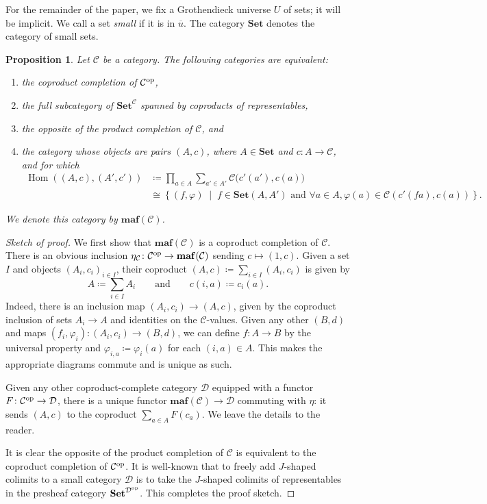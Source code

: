 \documentclass[11pt, one side, article]{memoir}
\theoremstyle{definition}
\theoremstyle{plain}
\newtheorem{proposition}[definitionx]{Proposition}
\DeclareMathOperator{\Hom}{Hom}
\newcommand{\cat}[1]{\mathcal{#1}}%
\newcommand{\Cat}[1]{\mathbf{#1}}%
\newcommand{\op}{^\tn{op}}
\newcommand{\tn}[1]{\textnormal{#1}}
\newcommand{\ol}[1]{\overline{#1}}
\newcommand{\smset}{\Cat{Set}}
\newcommand{\0}{\Cat{0}}
\newcommand{\1}{\Cat{1}}
\newcommand{\opfam}{\Cat{maf}}
\newcommand{\qqand}{\qquad\text{and}\qquad}
\begin{document}
For the remainder of the paper, we fix a Grothendieck universe $U$ of sets; it will be implicit. We call a set \emph{small} if it is in $\ol{u}$. The category $\smset$ denotes the category of small sets.

\begin{proposition}\label{prop.tfae}
Let $\cat{C}$ be a category. The following categories are equivalent:
\begin{enumerate}
	\item the coproduct completion of $\cat{C}\op$,
	\item the full subcategory of $\smset^\cat{C}$ spanned by coproducts of representables,
	\item the opposite of the product completion of $\cat{C}$, and
	\item the category whose objects are pairs $(A,c)$, where $A\in\smset$ and $c\colon A\to\cat{C}$, and for which
	\begin{align*}
	\Hom((A,c),(A',c'))&\coloneqq\prod_{a\in A}\sum_{a'\in A'}\cat{C}\big(c'(a'),c(a)\big)\\&\cong\left\{(f,\varphi)\;\middle|\; f\in\smset(A,A')\text{ and }\forall a\in A, \varphi(a)\in\cat{C}(c'(fa),c(a))\right\}.
	\end{align*}
\end{enumerate}
We denote this category by $\opfam(\cat{C})$.
\end{proposition}
\begin{proof}[Sketch of proof]
We first show that $\opfam(\cat{C})$ is a coproduct completion of $\cat{C}$. There is an obvious inclusion $\eta_\cat{C}\colon \cat{C}\op\to\opfam(\cat{C})$ sending $c\mapsto (1,c)$. Given a set $I$ and objects $(A_i,c_i)_{i\in I}$, their coproduct $(A,c)\coloneqq\sum_{i\in I}(A_i,c_i)$ is given by
\[
A\coloneqq\sum_{i\in I}A_i
\qqand
c(i,a)\coloneqq c_i(a).
\]
Indeed, there is an inclusion map $(A_i,c_i)\to (A,c)$, given by the coproduct inclusion of sets $A_i\to A$ and identities on the $\cat{C}$-values. Given any other $(B,d)$ and maps $(f_i,\varphi_i)\colon (A_i,c_i)\to(B,d)$, we can define $f\colon A\to B$ by the universal property and $\varphi_{i,a}\coloneqq\varphi_i(a)$ for each $(i,a)\in A$. This makes the appropriate diagrams commute and is unique as such.

Given any other coproduct-complete category $\cat{D}$ equipped with a functor $F\colon\cat{C}\op\to\cat{D}$, there is a unique functor $\opfam(\cat{C})\to\cat{D}$ commuting with $\eta$: it sends $(A,c)$ to the coproduct $\sum_{a\in A}F(c_a)$. We leave the details to the reader.

It is clear the opposite of the product completion of $\cat{C}$ is equivalent to the coproduct completion of $\cat{C}\op$. It is well-known that to freely add $J$-shaped colimits to a small category $\cat{D}$ is to take the $J$-shaped colimits of representables in the presheaf category $\smset^{\cat{D}\op}$. This completes the proof sketch.
\end{proof}
\end{document}

